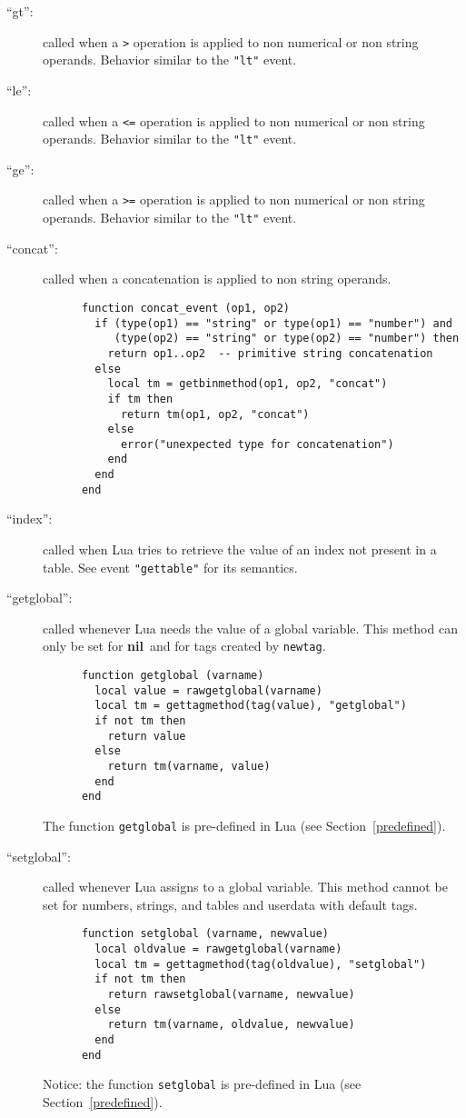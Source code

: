 \documentclass[11pt]{article}
\newcommand{\See}[1]{Section~\ref{#1}}
\newcommand{\see}[1]{(see \See{#1})}
\newcommand{\nil}{{\bf nil}}
\begin{document}
\begin{description}
\item[``gt'':]
called when a \verb|>| operation is applied to non numerical
or non string operands.
Behavior similar to the \verb|"lt"| event.

\item[``le'':]
called when a \verb|<=| operation is applied to non numerical
or non string operands.
Behavior similar to the \verb|"lt"| event.

\item[``ge'':]
called when a \verb|>=| operation is applied to non numerical
or non string operands.
Behavior similar to the \verb|"lt"| event.

\item[``concat'':]
called when a concatenation is applied to non string operands.
\begin{verbatim}
      function concat_event (op1, op2)
        if (type(op1) == "string" or type(op1) == "number") and
           (type(op2) == "string" or type(op2) == "number") then
          return op1..op2  -- primitive string concatenation
        else
          local tm = getbinmethod(op1, op2, "concat")
          if tm then
            return tm(op1, op2, "concat")
          else
            error("unexpected type for concatenation")
          end
        end
      end
\end{verbatim}

\item[``index'':]
called when Lua tries to retrieve the value of an index
not present in a table.
See event \verb|"gettable"| for its semantics.

\item[``getglobal'':]
called whenever Lua needs the value of a global variable.
This method can only be set for \nil\ and for tags
created by \verb|newtag|.
\begin{verbatim}
      function getglobal (varname)
        local value = rawgetglobal(varname)
        local tm = gettagmethod(tag(value), "getglobal")
        if not tm then
          return value
        else
          return tm(varname, value)
        end
      end
\end{verbatim}
The function \verb|getglobal| is pre-defined in Lua \see{predefined}.

\item[``setglobal'':]
called whenever Lua assigns to a global variable.
This method cannot be set for numbers, strings, and tables and
userdata with default tags.
\begin{verbatim}
      function setglobal (varname, newvalue)
        local oldvalue = rawgetglobal(varname)
        local tm = gettagmethod(tag(oldvalue), "setglobal")
        if not tm then
          return rawsetglobal(varname, newvalue)
        else
          return tm(varname, oldvalue, newvalue)
        end
      end
\end{verbatim}
Notice: the function \verb|setglobal| is pre-defined in Lua \see{predefined}.


\end{description}
\end{document}

